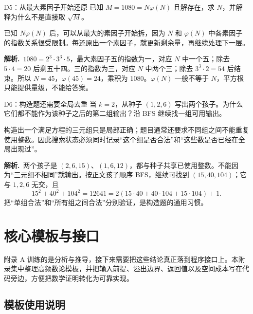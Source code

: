 \documentclass[UTF8,a4paper,11pt,twoside,openright,fontset=fandol]{ctexbook}
\theoremstyle{definition}
\newcommand{\sol}{\par\noindent\textbf{解析.}\ }
\begin{document}
\begin{problem}{D5：从最大素因子开始还原}
已知 $M=1080=N\varphi(N)$ 且解存在，求 $N$，并解释为什么不是直接取 $\sqrt M$。
\end{problem}

\begin{pitfall}[讲解：先看这题到底在做什么]
已知 $N\varphi(N)$ 后，可以从最大的素因子开始拆，因为 $N$ 和 $\varphi(N)$ 中各素因子的指数关系很受限制。每还原出一个素因子，就更新剩余量，再继续处理下一层。
\end{pitfall}

\sol $1080=2^3\cdot3^3\cdot5$，最大素因子五的指数为一，对应 $N$ 中一个五；除去 $5\cdot4=20$ 后剩五十四。三的指数为三，对应 $N$ 中两个三；除去 $3^3\cdot2=54$ 后结束。所以 $N=45$，$\varphi(45)=24$，乘积为 $1080$。$\varphi(N)$ 一般不等于 $N$，平方根只能提供量级，不能给答案。


\begin{problem}{D6：构造题还需要全局去重}
当 $k=2$，从种子 $(1,2,6)$ 写出两个孩子。为什么它们都不能作为该种子之后的第二组输出？沿 BFS 继续找一组可用输出。
\end{problem}

\begin{pitfall}[讲解：先看这题到底在做什么]
构造出一个满足方程的三元组只是局部正确；题目通常还要求不同组之间不能重复使用整数。因此搜索状态必须同时记录“这个组是否合法”和“这些数是否已经在全局出现过”。
\end{pitfall}

\sol 两个孩子是 $(2,6,15)$、$(1,6,12)$，都与种子共享已使用整数。不能因为“三元组不相同”就输出。按正文孩子顺序 BFS，继续可找到 $(15,40,104)$；它与 $1,2,6$ 无交，且
\[
15^2+40^2+104^2=12641=2(15\cdot40+40\cdot104+15\cdot104)+1.
\]
把“单组合法”和“所有组之间合法”分别验证，是构造题的通用习惯。




\clearpage
\setcounter{page}{1}
\chapter{核心模板与接口}
\begin{chapterintro}[章节导读]
附录 A 训练的是分析与推导，接下来需要把这些结论真正落到程序接口上。本附录集中整理高频数论模板，并把输入前提、溢出边界、返回值以及空间成本写在代码旁边，方便把数学证明转化为可靠实现。
\end{chapterintro}

\section{模板使用说明}
\end{document}
